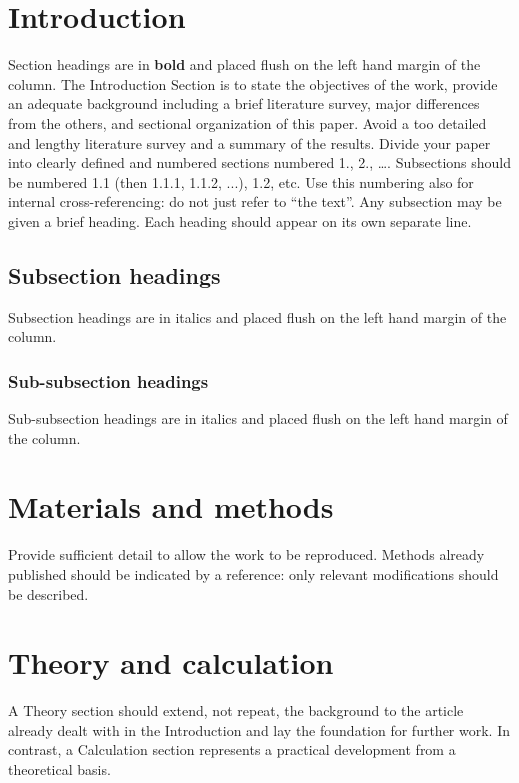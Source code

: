 \documentclass{iac}
\begin{document}
\section{Introduction}

Section headings are in \textbf{bold} and placed flush on the left hand margin of the column.
The Introduction Section is to state the objectives of the work, provide an adequate background including a brief literature survey, major differences from the others, and sectional organization of this paper. Avoid a too detailed and lengthy literature survey and a summary of the results.
Divide your paper into clearly defined and numbered sections numbered 1., 2., …. Subsections should be numbered 1.1 (then 1.1.1, 1.1.2, ...), 1.2, etc. Use this numbering also for internal cross-referencing: do not just refer to “the text”. Any subsection may be given a brief heading. Each heading should appear on its own separate line. 

\subsection{Subsection headings}
Subsection headings are in italics and placed flush on the left hand margin of the column.

\subsubsection{Sub-subsection headings}
Sub-subsection headings are in italics and placed flush on the left hand margin of the column.

\section{Materials and methods}

Provide sufficient detail to allow the work to be reproduced. Methods already published should be indicated by a reference: only relevant modifications should be described.

\section{Theory and calculation}

A Theory section should extend, not repeat, the background to the article already dealt with in the Introduction and lay the foundation for further work. In contrast, a Calculation section represents a practical development from a theoretical basis.
\end{document}
